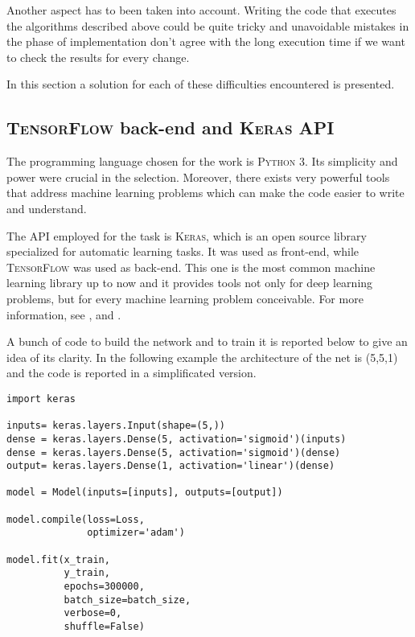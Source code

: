 Another aspect has to been taken into account. Writing the code that executes the algorithms described above could be quite tricky and unavoidable mistakes in the phase of implementation don't agree with the long execution time if we want to check the results for every change.

In this section a solution for each of these difficulties encountered is presented.



\subsection{\textsc{TensorFlow} back-end and \textsc{Keras} API}
The programming language chosen for the work is \textsc{Python 3}. Its simplicity and power were crucial in the selection. Moreover, there exists very powerful tools that address machine learning problems which can make the code easier to write and understand.

The API employed for the task is \textsc{Keras}, which is an open source library specialized for automatic learning tasks. It was used as front-end, while \textsc{TensorFlow} was used as back-end. This one is the most common machine learning library up to now and it provides tools not only for deep learning problems, but for every machine learning problem conceivable. For more information, see \cite{python}, \cite{keras} and \cite{tensorflow}.

A bunch of code to build the network and to train it is reported below to give an idea of its clarity. In the following example the architecture of the net is (5,5,1) and the code is reported in a simplificated version.

\begin{lstlisting}[frame=single]
import keras

inputs= keras.layers.Input(shape=(5,))
dense = keras.layers.Dense(5, activation='sigmoid')(inputs)
dense = keras.layers.Dense(5, activation='sigmoid')(dense)
output= keras.layers.Dense(1, activation='linear')(dense)

model = Model(inputs=[inputs], outputs=[output])

model.compile(loss=Loss,
              optimizer='adam')

model.fit(x_train, 
          y_train,
          epochs=300000,
          batch_size=batch_size,
          verbose=0,
          shuffle=False)
\end{lstlisting}



